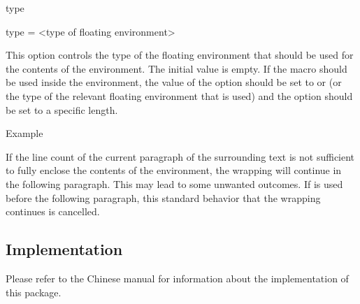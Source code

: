 \documentclass{ctxdoc}
\begin{document}
\begin{documentation}
 \begin{function}{type}
   \begin{syntax}
     type = <type of floating environment>
   \end{syntax}
   This option controls the type of the floating environment that should be used for the contents of the  environment. The initial value is empty.
   If the  macro should be used inside the  environment,
   the value of the  option should be set to  or  (or the type of the relevant floating environment that is used) and the  option should be set to a specific length.
   \begin{SideBySideExample}[xrightmargin=\dimeval{19em+5mm}]
     \begin{wrapstuff}[type=figure,width=9em]
       \centering
       \caption{Example}
     \end{wrapstuff}
     \EXAMPLE
   \end{SideBySideExample}
 \end{function}

 \begin{function}{\wrapstuffclear}
   If the line count of the current paragraph of the surrounding text is not sufficient to fully enclose the contents of the  environment, the wrapping will continue in the following paragraph.
   This may lead to some unwanted outcomes. If  is used before the following paragraph, this standard behavior that the wrapping continues is cancelled.
 \end{function}

 \end{documentation}


 \begin{implementation}

  \section{Implementation}

  Please refer to the Chinese manual for information about the implementation of this package.

  \end{implementation}
\end{document}
